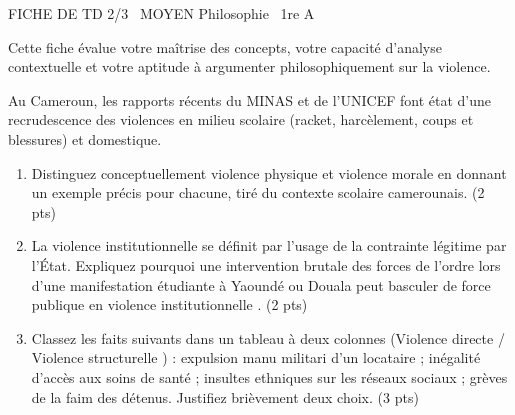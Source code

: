 \documentclass[11pt]{article}
\begin{document}
\begin{tcolorbox}[enhanced,colback=popink,colframe=popink,arc=10pt,boxrule=0pt,left=12pt,right=12pt,top=9pt,bottom=9pt]
{\color{white}\popxbold\small FICHE DE TD 2/3 \textbullet\ MOYEN \hfill Philosophie \textbullet\ 1re A\par}
\end{tcolorbox}
\vspace{4pt}
Cette fiche évalue votre maîtrise des concepts, votre capacité d'analyse contextuelle et votre aptitude à argumenter philosophiquement sur la violence.

\begin{exercice}
Au Cameroun, les rapports récents du MINAS et de l'UNICEF font état d'une recrudescence des violences en milieu scolaire (racket, harcèlement, coups et blessures) et domestique.
\begin{enumerate}
    \item Distinguez conceptuellement \og violence physique \fg{} et \og violence morale \fg{} en donnant un exemple précis pour chacune, tiré du contexte scolaire camerounais. (2 pts)
    \item La violence institutionnelle se définit par l'usage de la contrainte légitime par l'État. Expliquez pourquoi une intervention brutale des forces de l'ordre lors d'une manifestation étudiante à Yaoundé ou Douala peut basculer de \og force publique \fg{} en \og violence institutionnelle \fg{}. (2 pts)
    \item Classez les faits suivants dans un tableau à deux colonnes (\og Violence directe \fg{} / \og Violence structurelle \fg{}) : expulsion manu militari d'un locataire ; inégalité d'accès aux soins de santé ; insultes ethniques sur les réseaux sociaux ; grèves de la faim des détenus. Justifiez brièvement deux choix. (3 pts)
\end{enumerate}
\end{exercice}
\end{document}
